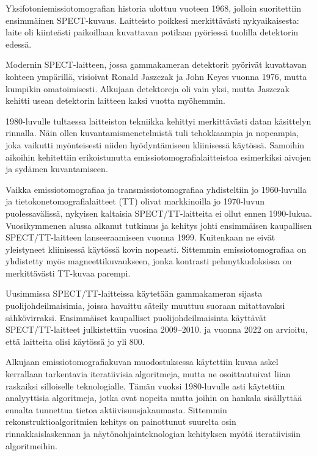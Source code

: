Yksifotoniemissiotomografian historia ulottuu vuoteen 1968, jolloin suoritettiin ensimmäinen SPECT-kuvaus. Laitteisto poikkesi merkittävästi nykyaikaisesta: laite oli kiinteästi paikoillaan kuvattavan potilaan pyöriessä tuolilla detektorin edessä.\cite{jaszczak_early_2006, hutton_origins_2014}

Modernin SPECT-laitteen, jossa gammakameran detektorit pyörivät kuvattavan kohteen ympärillä, visioivat Ronald Jaszczak ja John Keyes vuonna 1976, mutta kumpikin omatoimisesti\cite{jaszczak_early_2006}. Alkujaan detektoreja oli vain yksi, mutta Jaszczak kehitti usean detektorin laitteen kaksi vuotta myöhemmin\cite{jaszczak_early_2006, hutton_origins_2014}.

1980-luvulle tultaessa laitteiston tekniikka kehittyi merkittävästi datan käsittelyn rinnalla. Näin ollen kuvantamismenetelmistä tuli tehokkaampia ja nopeampia, joka vaikutti myönteisesti niiden hyödyntämiseen kliinisessä käytössä\cite{jaszczak_early_2006}. Samoihin aikoihin kehitettiin erikoistunutta emissiotomografialaitteistoa esimerkiksi aivojen ja sydämen kuvantamiseen\cite{hutton_origins_2014}.

Vaikka emissiotomografiaa ja transmissiotomografiaa yhdisteltiin jo 1960-luvulla ja tietokonetomografialaitteet (TT) olivat markkinoilla jo 1970-luvun puolessavälissä, nykyisen kaltaisia SPECT/TT-laitteita ei ollut ennen 1990-lukua\cite{bercovich_medical_2018, hutton_origins_2014}. Vuosikymmenen alussa alkanut tutkimus ja kehitys johti ensimmäisen kaupallisen SPECT/TT-laitteen lanseeraamiseen vuonna 1999. Kuitenkaan ne eivät yleistyneet kliinisessä käytössä kovin nopeasti.\cite{hutton_origins_2014} Sittemmin emissiotomografiaa on yhdistetty myös magneettikuvaukseen, jonka kontrasti pehmytkudoksissa on merkittävästi TT-kuvaa parempi\cite{wettenhovi_omegaopen-source_2021}.

Uusimmissa SPECT/TT-laitteissa käytetään gammakameran sijasta puolijohdeilmaisimia, joissa havaittu säteily muuttuu suoraan mitattavaksi sähkövirraksi. Ensimmäiset kaupalliset puolijohdeilmaisinta käyttävät SPECT/TT-laitteet julkistettiin vuosina 2009--2010.\cite{hutton_origins_2014} ja vuonna 2022 on arvioitu, että laitteita olisi käytössä jo yli 800\cite{slomka_novel_2022}.

Alkujaan emissiotomografiakuvan muodostuksessa käytettiin kuvaa askel kerrallaan tarkentavia iteratiivisia algoritmeja, mutta ne osoittautuivat liian raskaiksi silloiselle teknologialle. Tämän vuoksi 1980-luvulle asti käytettiin analyyttisia algoritmeja, jotka ovat nopeita mutta joihin on hankala sisällyttää ennalta tunnettua tietoa aktiivisuusjakaumasta. Sittemmin rekonstruktioalgoritmien kehitys on painottunut suurelta osin rinnakkaislaskennan ja näytönohjainteknologian kehityksen myötä iteratiivisiin algoritmeihin.\cite{bruyant_analytic_2002} 

